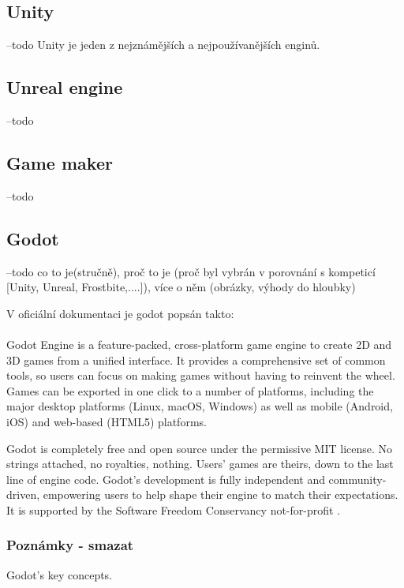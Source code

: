 \subsection{Unity}
	--todo
Unity\cite{unity_engine} je jeden z nejznámějších a nejpoužívanějších enginů.

\subsection{Unreal engine}
--todo

\subsection{Game maker}
--todo


\subsection{Godot}
--todo
co to je(stručně), proč to je (proč byl vybrán  v porovnání s kompeticí [Unity, Unreal, Frostbite,....]), více o  něm (obrázky, výhody do hloubky)

V oficiální dokumentaci je godot popsán takto:

\paragraph{}
Godot Engine is a feature-packed, cross-platform game engine to create 2D and 3D games from a unified interface. It provides a comprehensive set of common tools, so users can focus on making games without having to reinvent the wheel. Games can be exported in one click to a number of platforms, including the major desktop platforms (Linux, macOS, Windows) as well as mobile (Android, iOS) and web-based (HTML5) platforms.

Godot is completely free and open source under the permissive MIT license. No strings attached, no royalties, nothing. Users' games are theirs, down to the last line of engine code. Godot's development is fully independent and community-driven, empowering users to help shape their engine to match their expectations. It is supported by the Software Freedom Conservancy not-for-profit \cite{godot_introduction} .

\subsubsection{Poznámky - smazat}
Godot's key concepts.

